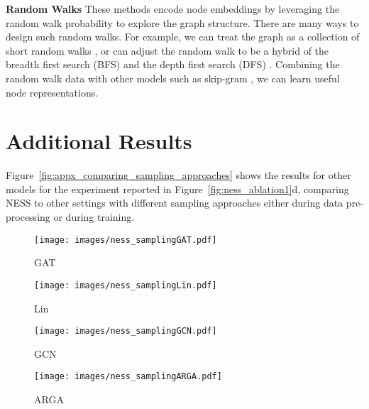 \documentclass{article}
\begin{document}
\textbf{Random Walks} These methods encode node embeddings by leveraging the random walk probability to explore the graph structure.  There are many ways to design such random walks. For example, we can treat the graph as a collection of short random walks \citep{perozzi2014deepwalk}, or can adjust the random walk to be a hybrid of the breadth first search (BFS) and the depth first search (DFS) \citep{grover2016node2vec}. Combining the random walk data with other models such as skip-gram \citep{mikolov2013efficient}, we can learn useful node representations.



\section{Additional Results}

Figure~\ref{fig:appx_comparing_sampling_approaches} shows the results for other models for the experiment reported in Figure~\ref{fig:ness_ablation1}d, comparing NESS to other settings with different sampling approaches either during data pre-processing or during training.

\begin{figure*}[ht]
\vskip 0.2in
\begin{center}
     \begin{subfigure}[c]{0.21\textwidth}
         \texttt{[image: images/ness\_samplingGAT.pdf]}
         \caption{GAT}
     \end{subfigure}
     \begin{subfigure}[c]{0.21\textwidth}
         \texttt{[image: images/ness\_samplingLin.pdf]}
         \caption{Lin}
     \end{subfigure}
     \begin{subfigure}[c]{0.21\textwidth}
         \texttt{[image: images/ness\_samplingGCN.pdf]}
         \caption{GCN}
     \end{subfigure}
     \begin{subfigure}[c]{0.3\textwidth}
         \texttt{[image: images/ness\_samplingARGA.pdf]}
         \caption{ARGA}
     \end{subfigure}
     
\caption{Showing difference in AUC scores (\%) that we obtain using our default method, compared to other sampling approaches applied during data preprocessing. Our default NESS setting using random edge split to partition the graph usually outperforms others.}\label{fig:appx_comparing_sampling_approaches}
\end{center}
\vskip -0.2in
\end{figure*}
\end{document}
